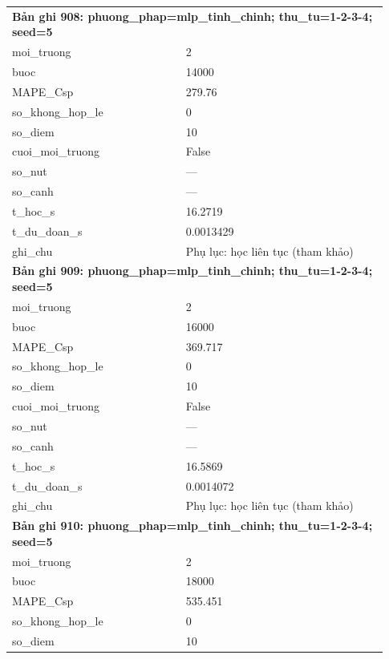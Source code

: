 \begin{longtable}{p{0.43\linewidth}p{0.50\linewidth}}
\midrule
\multicolumn{2}{p{0.95\linewidth}}{\textbf{Bản ghi 908: phuong\_phap=mlp\_tinh\_chinh; thu\_tu=1-2-3-4; seed=5}} \\
moi\_\allowbreak truong & 2 \\
buoc & 14000 \\
MAPE\_\allowbreak Csp & 279.76 \\
so\_\allowbreak khong\_\allowbreak hop\_\allowbreak le & 0 \\
so\_\allowbreak diem & 10 \\
cuoi\_\allowbreak moi\_\allowbreak truong & False \\
so\_\allowbreak nut & — \\
so\_\allowbreak canh & — \\
t\_\allowbreak hoc\_\allowbreak s & 16.2719 \\
t\_\allowbreak du\_\allowbreak doan\_\allowbreak s & 0.0013429 \\
ghi\_\allowbreak chu & Phụ lục: học liên tục (tham khảo) \\
\midrule
\multicolumn{2}{p{0.95\linewidth}}{\textbf{Bản ghi 909: phuong\_phap=mlp\_tinh\_chinh; thu\_tu=1-2-3-4; seed=5}} \\
moi\_\allowbreak truong & 2 \\
buoc & 16000 \\
MAPE\_\allowbreak Csp & 369.717 \\
so\_\allowbreak khong\_\allowbreak hop\_\allowbreak le & 0 \\
so\_\allowbreak diem & 10 \\
cuoi\_\allowbreak moi\_\allowbreak truong & False \\
so\_\allowbreak nut & — \\
so\_\allowbreak canh & — \\
t\_\allowbreak hoc\_\allowbreak s & 16.5869 \\
t\_\allowbreak du\_\allowbreak doan\_\allowbreak s & 0.0014072 \\
ghi\_\allowbreak chu & Phụ lục: học liên tục (tham khảo) \\
\midrule
\multicolumn{2}{p{0.95\linewidth}}{\textbf{Bản ghi 910: phuong\_phap=mlp\_tinh\_chinh; thu\_tu=1-2-3-4; seed=5}} \\
moi\_\allowbreak truong & 2 \\
buoc & 18000 \\
MAPE\_\allowbreak Csp & 535.451 \\
so\_\allowbreak khong\_\allowbreak hop\_\allowbreak le & 0 \\
so\_\allowbreak diem & 10 \\

\end{longtable}
